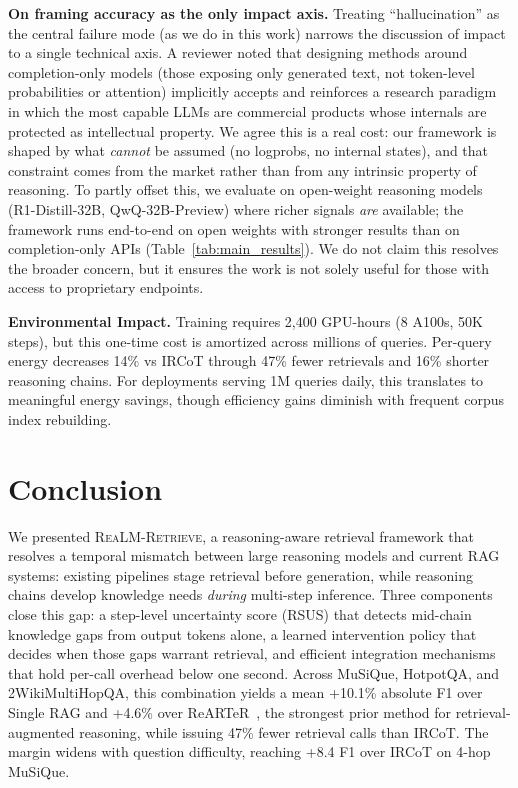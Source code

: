 \documentclass[sigconf,natbib=true]{acmart}
\newcommand{\methodname}{\textsc{ReaLM-Retrieve}}
\begin{document}
\textbf{On framing accuracy as the only impact axis.}
Treating ``hallucination'' as the central failure mode (as we do in this work) narrows the discussion of impact to a single technical axis. A reviewer noted that designing methods around completion-only models (those exposing only generated text, not token-level probabilities or attention) implicitly accepts and reinforces a research paradigm in which the most capable LLMs are commercial products whose internals are protected as intellectual property. We agree this is a real cost: our framework is shaped by what \emph{cannot} be assumed (no logprobs, no internal states), and that constraint comes from the market rather than from any intrinsic property of reasoning. To partly offset this, we evaluate on open-weight reasoning models (R1-Distill-32B, QwQ-32B-Preview) where richer signals \emph{are} available; the framework runs end-to-end on open weights with stronger results than on completion-only APIs (Table~\ref{tab:main_results}). We do not claim this resolves the broader concern, but it ensures the work is not solely useful for those with access to proprietary endpoints.

\textbf{Environmental Impact.} Training requires 2,400 GPU-hours (8 A100s, 50K steps), but this one-time cost is amortized across millions of queries. Per-query energy decreases 14\% vs IRCoT through 47\% fewer retrievals and 16\% shorter reasoning chains. For deployments serving 1M queries daily, this translates to meaningful energy savings, though efficiency gains diminish with frequent corpus index rebuilding.

\section{Conclusion}
\label{sec:conclusion}

We presented \methodname{}, a reasoning-aware retrieval framework that resolves a temporal mismatch between large reasoning models and current RAG systems: existing pipelines stage retrieval before generation, while reasoning chains develop knowledge needs \emph{during} multi-step inference. Three components close this gap: a step-level uncertainty score (RSUS) that detects mid-chain knowledge gaps from output tokens alone, a learned intervention policy that decides when those gaps warrant retrieval, and efficient integration mechanisms that hold per-call overhead below one second. Across MuSiQue, HotpotQA, and 2WikiMultiHopQA, this combination yields a mean +10.1\% absolute F1 over Single RAG and +4.6\% over ReARTeR~\cite{sun2025rearter}, the strongest prior method for retrieval-augmented reasoning, while issuing 47\% fewer retrieval calls than IRCoT. The margin widens with question difficulty, reaching +8.4 F1 over IRCoT on 4-hop MuSiQue.
\end{document}
